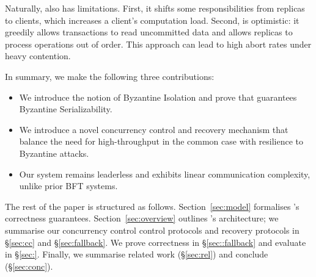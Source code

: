 Naturally, \sys{} also has limitations. First, it shifts some
responsibilities from replicas to clients, which increases a client's computation load. Second, \sys{} is optimistic: it greedily allows transactions to read uncommitted data and allows replicas to process operations out of order. This approach can lead to high abort rates under heavy contention.

In summary, we make the following three contributions: 
\begin{itemize}
\item We introduce the notion of Byzantine Isolation and prove that \sys guarantees
Byzantine Serializability.
\item We introduce a novel concurrency control and recovery mechanism that balance the need for high-throughput in
the common case with resilience to Byzantine attacks.
\item Our system remains leaderless and exhibits linear communication complexity, unlike prior BFT systems.
\end{itemize}


The rest of the paper is structured as follows. Section~\ref{sec:model} formalises \sys{}'s correctness guarantees.
Section~\ref{sec:overview} outlines
\sys's architecture; we summarise our concurrency control control protocols and recovery protocols in \S\ref{sec:cc} and \S\ref{sec:fallback}. We
prove correctness in \S\ref{sec::fallback} and evaluate \sys in \S\ref{sec:}. Finally, we summarise related work (\S\ref{sec:rel}) and conclude (\S\ref{sec:conc}).


